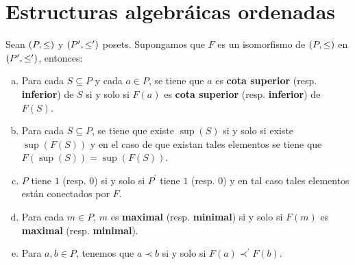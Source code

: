 \section{Estructuras algebráicas ordenadas}

  \begin{lemma} \label{lemma_1}
    \PN Sean $(P, \leq)$ y $(P^{\prime}, \leq^{\prime})$ posets. Supongamos que $F$ es un isomorfismo de $(P, \leq)$ en $(P^{\prime}, \leq^{\prime})$,
    entonces:
    \begin{enumerate}[a)]
      \item Para cada $S \subseteq P$ y cada $a \in P$, se tiene que $a$ es \textbf{cota superior} (resp.
        \textbf{inferior}) de $S$ si y solo si $F(a)$ es \textbf{cota superior} (resp. \textbf{inferior}) de $F(S)$.
      \item Para cada $S \subseteq P$, se tiene que existe $\sup (S)$ si y solo si existe $\sup (F(S))$ y en el
        caso de que existan tales elementos se tiene que $F(\sup (S)) = \sup (F(S))$.
      \item $P$ tiene $1$ (resp. $0$) si y solo si $P^{\prime}$ tiene $1$ (resp. $0$) y en tal caso tales elementos
        están conectados por $F$.
      \item Para cada $m \in P$, $m$ es \textbf{maximal} (resp. \textbf{minimal}) si y solo si $F(m)$ es
        \textbf{maximal} (resp. \textbf{minimal}).
      \item Para $a, b \in P$, tenemos que $a \prec b$ si y solo si $F(a) \prec^{\prime} F(b)$.
    \end{enumerate}
  \end{lemma}
